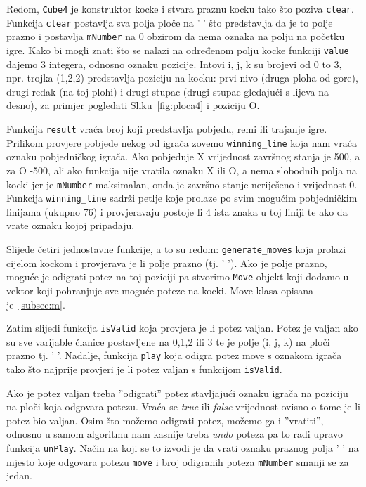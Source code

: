 \documentclass[12pt]{scrartcl}
\begin{document}
Redom, \texttt{Cube4} je konstruktor kocke i stvara praznu kocku tako što poziva \texttt{clear}. Funkcija \texttt{clear} postavlja sva polja ploče na ’ ’ što predstavlja da je to polje prazno i postavlja \texttt{mNumber} na 0 obzirom da nema oznaka na polju na početku igre. Kako bi mogli znati što se nalazi na određenom polju
kocke funkciji \texttt{value} dajemo 3 integera, odnosno oznaku pozicije. Intovi i, j, k su brojevi od 0 to 3, npr. trojka (1,2,2) predstavlja poziciju na kocku: prvi nivo (druga ploha od gore), drugi redak (na toj plohi) i drugi stupac (drugi stupac gledajući s lijeva na desno), za primjer pogledati Sliku~\ref{fig:ploca4} i poziciju O.


Funkcija \texttt{result} vraća broj koji predstavlja pobjedu, remi ili trajanje igre. Prilikom provjere pobjede nekog od igrača zovemo \texttt{winning\_line} koja nam vraća oznaku pobjedničkog igrača. Ako pobjeđuje X vrijednost završnog stanja je 500, a za O -500, ali ako funkcija nije vratila oznaku X ili O, a nema slobodnih polja na kocki jer je \texttt{mNumber} maksimalan, onda je završno stanje neriješeno i vrijednost 0. Funkcija \texttt{winning\_line} sadrži petlje koje prolaze po svim mogućim pobjedničkim linijama (ukupno 76) i provjeravaju postoje li 4 ista znaka u toj liniji te ako da vrate oznaku kojoj pripadaju.

Slijede četiri jednostavne funkcije, a to su redom: \texttt{generate\_moves} koja prolazi cijelom kockom i provjerava je li polje prazno (tj. ’ ’). Ako je polje prazno, moguće je odigrati potez na toj poziciji pa stvorimo \texttt{Move} objekt koji dodamo u vektor koji pohranjuje sve moguće poteze na kocki. Move klasa opisana je~\ref{subsec:m}. 

Zatim slijedi funkcija \texttt{isValid} koja provjera je li potez valjan. Potez je valjan ako su sve varijable članice postavljene na 0,1,2 ili 3 te je polje (i, j, k) na ploči prazno tj. ’ ’. Nadalje, funkcija \texttt{play} koja odigra potez move s oznakom igrača tako što najprije provjeri je li potez valjan s funkcijom \texttt{isValid}.


Ako je potez valjan treba ”odigrati” potez stavljajući oznaku igrača na poziciju na ploči koja odgovara potezu. Vraća se \emph{true} ili \emph{false} vrijednost ovisno o tome
je li potez bio valjan. Osim što možemo odigrati potez, možemo ga i ”vratiti”, odnosno u samom algoritmu nam kasnije treba \emph{undo} poteza pa to radi upravo funkcija \texttt{unPlay}. Način na koji se to izvodi je da vrati oznaku praznog polja ’ ’ na mjesto koje odgovara potezu \texttt{move} i broj odigranih poteza \texttt{mNumber} smanji se za jedan.
\end{document}
